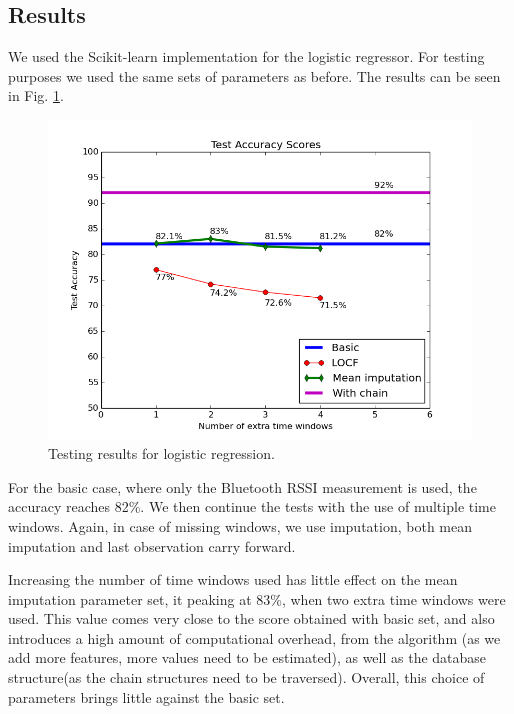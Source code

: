 \subsection{Results}

We used the Scikit-learn \cite{scikit-learn} implementation for the logistic regressor. For testing purposes we used the same sets of parameters as before. The results can be seen in Fig. \ref{pic:logic_tot}.

\begin{figure}[h]
	\begin{center}
		\includegraphics[scale=0.7]{figures/logic_tot.png}
	\end{center}
	
	\caption{Testing results for logistic regression.}
	\label{pic:logic_tot}

\end{figure}

For the basic case, where only the Bluetooth RSSI measurement is used, the accuracy reaches 82\%. We then continue the tests with the use of multiple time windows. Again, in case of missing windows, we use imputation, both mean imputation and last observation carry forward. 

Increasing the number of time windows used has little effect on the mean imputation parameter set, it peaking at 83\%, when two extra time windows were used. This value comes very close to the score obtained with basic set, and also introduces a high amount of computational overhead, from the algorithm (as we add more features, more values need to be estimated), as well as the database structure(as the chain structures need to be traversed). Overall, this choice of parameters brings little against the basic set.


